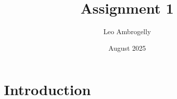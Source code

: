 \documentclass{article}
\title{Assignment 1}
\author{Leo Ambrogelly}
\date{August 2025}
\begin{document}
\maketitle

\section{Introduction}
\end{document}
